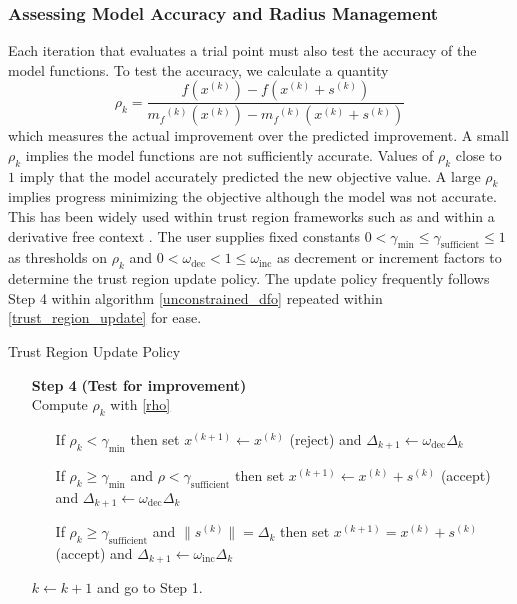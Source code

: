 \documentclass{article}
\theoremstyle{case}
\newcommand{\modelk}{{{m}_f}^{(k)}}
\newcommand{\iteratek}{{x}^{(k)}}
\newcommand{\trialk}{{{s}^{(k)}}}
\newcommand{\iteratekpone}{{x}^{(k+1)}}
\newcommand{\omegainc}{\omega_{\text{inc}}}
\newcommand{\omegadec}{\omega_{\text{dec}}}
\newcommand{\gammasm}{\gamma_{\text{min}}}
\newcommand{\gammabi}{\gamma_{\text{sufficient}}}
\begin{document}
\subsubsection{Assessing Model Accuracy and Radius Management}

Each iteration that evaluates a trial point must also test the accuracy of the model functions.
To test the accuracy, we calculate a quantity
\begin{equation}
\label{rho}
\rho_k = \frac{f(\iteratek) - f(\iteratek+\trialk)}{\modelk(\iteratek) - \modelk(\iteratek+\trialk)}
\end{equation}
which measures the actual improvement over the predicted improvement.
A small $\rho_k$ implies the model functions are not sufficiently accurate.
Values of $\rho_k$ close to $1$ imply that the model accurately predicted the new objective value.
A large $\rho_k$ implies progress minimizing the objective although the model was not accurate.
This has been widely used within trust region frameworks such as \cite{Conn:2000:TM:357813} and within a derivative free context \cite{DUMMY:intro_book}.
The user supplies fixed constants $0 < \gammasm \le \gammabi \le 1$ as thresholds on $\rho_k$ and $0 < \omega_{\text{dec}} < 1 \le \omega_{\text{inc}}$ as decrement or increment factors to determine the trust region update policy.
The update policy frequently follows Step 4 within algorithm \cref{unconstrained_dfo} repeated within \cref{trust_region_update} for ease.

\begin{algorithm}[H]
    \caption{Trust Region Update Policy}
    \label{trust_region_update}
    \begin{itemize}
        \item[\textbf{Step 4}] \textbf{(Test for improvement)} \\
            Compute $\rho_k$ with \cref{rho} \begin{itemize}
                \item[] If $\rho_k < \gammasm$ then set $\iteratekpone \gets \iteratek$ (reject) and $\Delta_{k+1} \gets \omegadec\Delta_{k}$
                \item[] If $\rho_k \ge \gammasm$ and $\rho < \gammabi$ then set $\iteratekpone\gets\iteratek+\trialk$ (accept) and $\Delta_{k+1} \gets \omegadec\Delta_{k}$
                \item[] If $\rho_k \ge \gammabi$ and $\|\trialk\| = \Delta_{k}$ then set $\iteratekpone=\iteratek+\trialk$ (accept) and $\Delta_{k+1} \gets \omegainc\Delta_{k}$
            \end{itemize}
            $k \gets k+1$ and go to Step 1.
    \end{itemize}
\end{algorithm}
\end{document}
